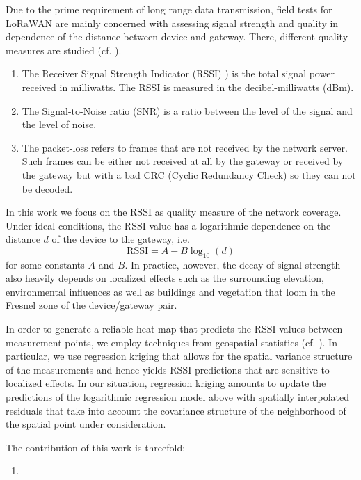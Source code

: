 Due to the prime requirement of long range data transmission, field tests for LoRaWAN are mainly concerned with assessing signal strength and quality in dependence of the distance between device and gateway. There, different quality measures are studied (cf. \cite{Aref2014, Marais2017, }).
\begin{enumerate}
\item The Receiver Signal Strength Indicator (RSSI) ) is the total signal power received in milliwatts. The RSSI  is  measured  in  the  decibel-milliwatts  (dBm).
\item The Signal-to-Noise ratio (SNR) is  a  ratio  between  the  level  of  the  signal  and  the  level  of noise.
\item The packet-loss refers to frames that are not received by the network server. Such frames can be either not received at all by the gateway or received by the gateway but with a bad CRC (Cyclic Redundancy Check) so they can not be decoded.
\end{enumerate}

In this work we focus on the RSSI as quality measure of the network coverage. Under ideal conditions, the RSSI value has a logarithmic dependence on the distance $d$ of the device to the gateway, i.e.
\begin{equation}\label{eqn:loglaw}
\text{RSSI} = A -B \log_{10}(d)
\end{equation}
for some constants $A$ and $B$. In practice, however, the decay of signal strength also heavily depends on localized effects such as the surrounding elevation, environmental influences as well as buildings and vegetation that loom in the Fresnel zone of the device/gateway pair.   

In order to generate a reliable heat map that predicts the RSSI values between measurement points, we employ techniques from geospatial statistics (cf. \cite{Cressi1993, Webster2007}). In particular, we use regression kriging that allows for the spatial variance structure of the measurements and hence yields RSSI predictions that are sensitive to localized effects. In our situation, regression kriging amounts to update the predictions of the logarithmic regression model above with spatially interpolated residuals that take into account the covariance structure of the neighborhood of the spatial point under consideration.  

The contribution of this work is threefold:
\begin{enumerate}
\item 
\end{enumerate}

